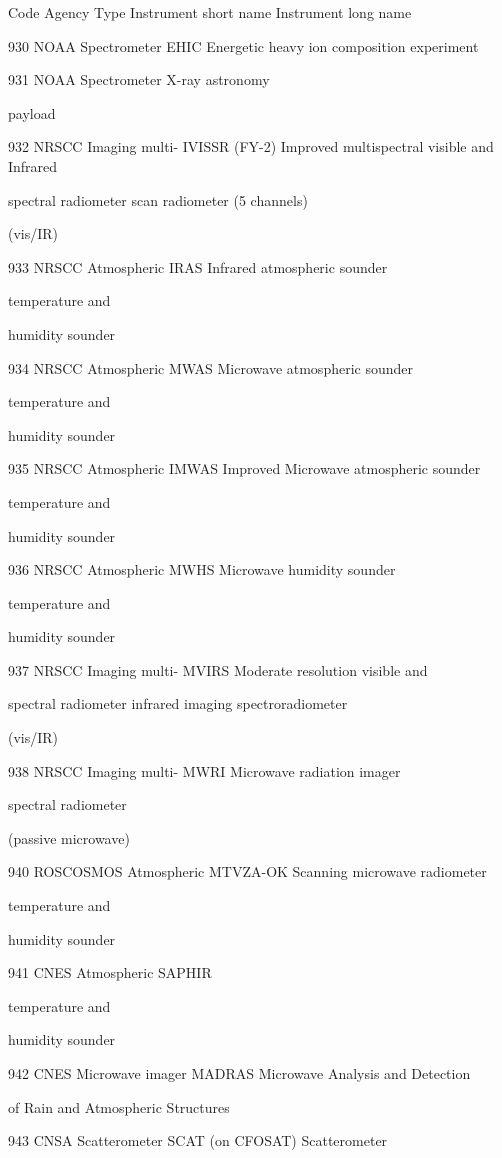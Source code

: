 Code Agency Type Instrument short name Instrument long name

930 NOAA Spectrometer EHIC Energetic heavy ion composition experiment

931 NOAA Spectrometer X-ray astronomy

payload

932 NRSCC Imaging multi- IVISSR (FY-2) Improved multispectral visible and Infrared

spectral radiometer scan radiometer (5 channels)

(vis/IR)

933 NRSCC Atmospheric IRAS Infrared atmospheric sounder

temperature and

humidity sounder

934 NRSCC Atmospheric MWAS Microwave atmospheric sounder

temperature and

humidity sounder

935 NRSCC Atmospheric IMWAS Improved Microwave atmospheric sounder

temperature and

humidity sounder

936 NRSCC Atmospheric MWHS Microwave humidity sounder

temperature and

humidity sounder

937 NRSCC Imaging multi- MVIRS Moderate resolution visible and

spectral radiometer infrared imaging spectroradiometer

(vis/IR)

938 NRSCC Imaging multi- MWRI Microwave radiation imager

spectral radiometer

(passive microwave)

940 ROSCOSMOS Atmospheric MTVZA-OK Scanning microwave radiometer

temperature and

humidity sounder

941 CNES Atmospheric SAPHIR

temperature and

humidity sounder

942 CNES Microwave imager MADRAS Microwave Analysis and Detection

of Rain and Atmospheric Structures

943 CNSA Scatterometer SCAT (on CFOSAT) Scatterometer

